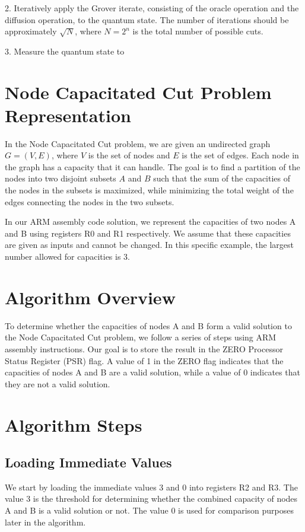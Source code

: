2. Iteratively apply the Grover iterate, consisting of the oracle operation and the diffusion operation, to the quantum state. The number of iterations should be approximately $\sqrt{N}$, where $N = 2^n$ is the total number of possible cuts.

3. Measure the quantum state to

\section{Node Capacitated Cut Problem Representation}

In the Node Capacitated Cut problem, we are given an undirected graph $G = (V, E)$, where $V$ is the set of nodes and $E$ is the set of edges. Each node in the graph has a capacity that it can handle. The goal is to find a partition of the nodes into two disjoint subsets $A$ and $B$ such that the sum of the capacities of the nodes in the subsets is maximized, while minimizing the total weight of the edges connecting the nodes in the two subsets.

In our ARM assembly code solution, we represent the capacities of two nodes A and B using registers R0 and R1 respectively. We assume that these capacities are given as inputs and cannot be changed. In this specific example, the largest number allowed for capacities is 3.

\section{Algorithm Overview}

To determine whether the capacities of nodes A and B form a valid solution to the Node Capacitated Cut problem, we follow a series of steps using ARM assembly instructions. Our goal is to store the result in the ZERO Processor Status Register (PSR) flag. A value of 1 in the ZERO flag indicates that the capacities of nodes A and B are a valid solution, while a value of 0 indicates that they are not a valid solution.

\section{Algorithm Steps}

\subsection{Loading Immediate Values}

We start by loading the immediate values 3 and 0 into registers R2 and R3. The value 3 is the threshold for determining whether the combined capacity of nodes A and B is a valid solution or not. The value 0 is used for comparison purposes later in the algorithm.

